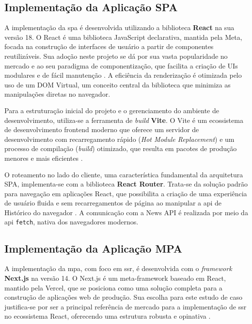 \subsection{Implementação da Aplicação SPA}
\label{ssec:implementacao_spa}

A implementação da \acrfull{spa} é desenvolvida utilizando a biblioteca \textbf{React} na sua versão 18. O React é uma biblioteca JavaScript declarativa, mantida pela Meta, focada na construção de interfaces de usuário a partir de componentes reutilizáveis. Sua adoção neste projeto se dá por sua vasta popularidade no mercado e ao seu paradigma de componentização, que facilita a criação de UIs modulares e de fácil manutenção \cite{react2025}. A eficiência da renderização é otimizada pelo uso de um DOM Virtual, um conceito central da biblioteca que minimiza as manipulações diretas no navegador.

Para a estruturação inicial do projeto e o gerenciamento do ambiente de desenvolvimento, utiliza-se a ferramenta de \textit{build} \textbf{Vite}. O Vite é um ecossistema de desenvolvimento frontend moderno que oferece um servidor de desenvolvimento com recarregamento rápido (\textit{Hot Module Replacement}) e um processo de compilação (\textit{build}) otimizado, que resulta em pacotes de produção menores e mais eficientes \cite{vite_docs}.

O roteamento no lado do cliente, uma característica fundamental da arquitetura SPA, implementa-se com a biblioteca \textbf{React Router}. Trata-se da solução padrão para navegação em aplicações React, que possibilita a criação de uma experiência de usuário fluida e sem recarregamentos de página ao manipular a \acrshort{api} de Histórico do navegador \cite{react_router_docs}. A comunicação com a News API é realizada por meio da \acrshort{api} \texttt{fetch}, nativa dos navegadores modernos.

\subsection{Implementação da Aplicação MPA}
\label{ssec:implementacao_mpa}

A implementação da \acrfull{mpa}, com foco em \acrfull{ssr}, é desenvolvida com o \emph{framework} \textbf{Next.js} na versão 14. O Next.js é um meta-framework baseado em React, mantido pela Vercel, que se posiciona como uma solução completa para a construção de aplicações web de produção. Sua escolha para este estudo de caso justifica-se por ser a principal referência de mercado para a implementação de \acrshort{ssr} no ecossistema React, oferecendo uma estrutura robusta e opinativa \cite{nextjs2024}.

